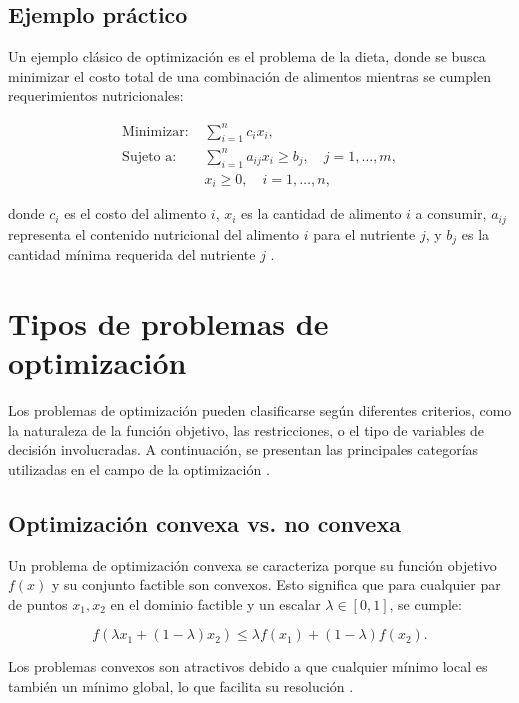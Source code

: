 \subsection{Ejemplo práctico}
Un ejemplo clásico de optimización es el problema de la dieta, donde se busca minimizar el costo total de una combinación de alimentos mientras se cumplen requerimientos nutricionales:

\begin{align}
	\text{Minimizar: } & \sum_{i=1}^n c_i x_i, \\
	\text{Sujeto a: } & \sum_{i=1}^n a_{ij} x_i \geq b_j, \quad j = 1, \dots, m, \\
	& x_i \geq 0, \quad i = 1, \dots, n,
\end{align}

donde \(c_i\) es el costo del alimento \(i\), \(x_i\) es la cantidad de alimento \(i\) a consumir, \(a_{ij}\) representa el contenido nutricional del alimento \(i\) para el nutriente \(j\), y \(b_j\) es la cantidad mínima requerida del nutriente \(j\) \cite{goodfellow2016deep}.

\section{Tipos de problemas de optimización}

Los problemas de optimización pueden clasificarse según diferentes criterios, como la naturaleza de la función objetivo, las restricciones, o el tipo de variables de decisión involucradas. A continuación, se presentan las principales categorías utilizadas en el campo de la optimización \cite{nocedal1999optimization}.

\subsection{Optimización convexa vs. no convexa}

Un problema de optimización convexa se caracteriza porque su función objetivo \(f(x)\) y su conjunto factible son convexos. Esto significa que para cualquier par de puntos \(x_1, x_2\) en el dominio factible y un escalar \(\lambda \in [0,1]\), se cumple:

\begin{equation}
	f(\lambda x_1 + (1 - \lambda)x_2) \leq \lambda f(x_1) + (1 - \lambda)f(x_2).
\end{equation}

Los problemas convexos son atractivos debido a que cualquier mínimo local es también un mínimo global, lo que facilita su resolución \cite{boyd2004convex}.

